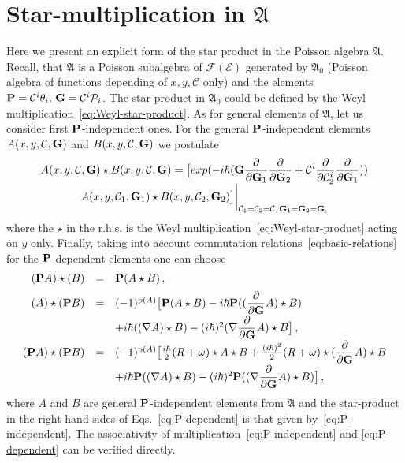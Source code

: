 \documentclass[a4paper,11pt,oneside]{amsart}
\theoremstyle{plain}
\numberwithin{equation}{section} %
\numberwithin{figure}{section} %
\newcommand{\p}[1]{{\rm p}(#1)}
\def\d{\partial}
\newcommand{\dl}[1]{\displaystyle\frac{{\d}}{\d #1}}
\def\cP{{\mathcal P}}
\def\cc{{\mathcal C}}
\newcommand{\formal}[1]{{{\mathcal F}}{(#1)}}             %
\def\aA{{ \mathfrak A}}
\def\E{{ \mathcal E}}
\def\P{{ \bf P}}
\def\G{{ \bf G}}
\begin{document}
\appendix
\section{Star-multiplication in $\aA$}\label{Appendix}
Here we present an explicit form of the star product
in the Poisson algebra $\aA$. Recall, that
$\aA$ is a Poisson subalgebra of $\formal{\E}$
generated by $\aA_0$ (Poisson algebra of functions depending of
$x,y,\cc$ only) and the elements
$\P=\cc^i\theta_i,\,\G=\cc^i \cP_i$. The star product in $\aA_0$
could be defined by the Weyl
multiplication~\eqref{eq:Weyl-star-product}.  As for general
elements of $\aA$, let us consider first $\P$-independent
ones.  For the general  $\P$-independent elements $A(x,y,\cc,\G)$
and $B(x,y,\cc,\G)$ we postulate
\begin{equation}
\label{eq:P-independent}
\begin{array}{c}
A(x,y,\cc,\G)\star B(x,y,\cc,\G)=\bigl[
exp (-i\hbar(\G\dl{\G_1}\dl{\G_2}+
\cc^i\dl{\cc^i_2}\dl{\G_1}))\\
A(x,y,\cc_1,\G_1)\star B(x,y,\cc_2,\G_2)
\bigr] {\bigg|}_{\cc_1=\cc_2=\cc,\, \G_1=\G_2=\G,}
\end{array}
\end{equation}
where the $\star$ in the r.h.s. is the Weyl
multiplication~\eqref{eq:Weyl-star-product}
acting on $y$ only.  Finally, taking into account commutation
relations~\eqref{eq:basic-relations} for the
$\P$-dependent elements one can choose
\begin{equation}
\label{eq:P-dependent}
\begin{array}{rcl}
(\P A)\star(B)&=&\P (A\star B)\,,\\[5pt]
(A)\star(\P B)&=&(-1)^{\p{A}}\bigl[
\P (A\star B)
-i \hbar \P ((\dl{\G}A)\star B)\\ [5pt]
&&
+i\hbar ((\nabla A)\star B)
-(i\hbar)^2 (\nabla \dl{\G} A)\star B \bigr] \,,\\ [5pt]
(\P A)\star(\P B)&=&(-1)^{\p{A}}\bigl[
\frac{i\hbar}{2} (R+\omega) \star A \star B
+\frac{(i \hbar)^2}{2} (R+\omega) \star (\dl{\G} A)\star B\\[5pt]
&&
+i\hbar \P ((\nabla A) \star B)
-(i\hbar)^2 \P ((\nabla \dl{\G} A)\star B) \bigr]\,,\\
\end{array}
\end{equation}
where $A$ and $B$ are general $\P$-independent elements
from $\aA$ and the star-product in the right hand sides of
Eqs.~\eqref{eq:P-dependent} is that given
by~\eqref{eq:P-independent}.  The associativity
of multiplication~\eqref{eq:P-independent} and \eqref{eq:P-dependent}
can be verified directly.
\end{document}
